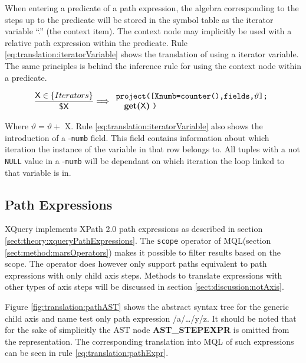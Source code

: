 When entering a predicate of a path expression, the algebra corresponding to the steps up to the predicate will be
stored in the symbol table as the iterator variable \textsf{``.''} (the context item). The context node may
implicitly be used with a relative path expression within the predicate. Rule
\ref{eq:translation:iteratorVariable} shows the translation of using a iterator variable. The same principles is
behind the inference rule for using the context node within a predicate.

\begin{equation}
\centering
\frac{\displaystyle \textsf{X} \in \left\{ Iterators \right\}}
	{\displaystyle \textsf{\$X}}
\Longrightarrow
\begin{array}{l}
	\mbox{\texttt{project([Xnumb=counter(),fields,}} \vartheta
	\mbox{\texttt{];}}
	\\ \quad
	\mbox{\textbf{get(}\textsf{X}\textbf{)} \texttt{)}}
\end{array}
\label{eq:translation:iteratorVariable}
\end{equation}

Where $\vartheta = \vartheta + $ \textsf{X}.
Rule \ref{eq:translation:iteratorVariable} also shows the introduction of a -\texttt{numb} field. This field
contains information about which iteration the instance of the variable in that row belongs to. All tuples with a
not \texttt{NULL} value in a -\texttt{numb} will be dependant on which iteration the loop linked to that variable
is in.


\subsection{Path Expressions}
\label{sect:translation:smpPathExpr}
XQuery implements XPath 2.0 path expressions as described in section
\ref{sect:theory:xqueryPathExpressions}. The \texttt{scope} operator of
MQL(section \ref{sect:method:marsOperators}) makes it possible to
filter results based on the scope. The operator does however only support paths
equivalent to path expressions with only \textsf{child} axis steps. Methods to
translate expressions with other types of axis steps will be discussed in
section \ref{sect:discussion:notAxis}.

Figure \ref{fig:translation:pathAST} shows the abstract syntax tree for the
generic child axis and name test only path expression \textsf{/a/\ldots/y/z}. It
should be noted that for the sake of simplicitly the AST node \textbf{AST\_STEPEXPR} is
omitted from the representation. The corresponding translation into MQL of such
expressions can be seen in rule \ref{eq:translation:pathExpr}.


